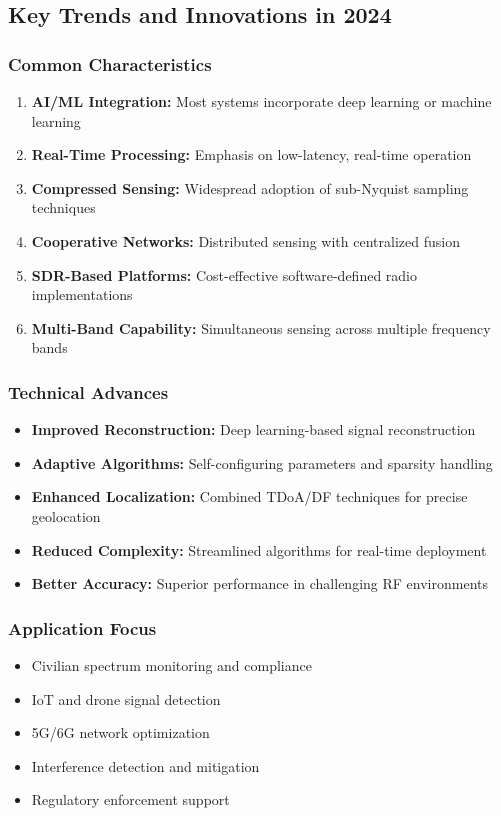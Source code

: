 \documentclass[14pt]{book}
\begin{document}
\subsection{Key Trends and Innovations in 2024}

\subsubsection{Common Characteristics}
\begin{enumerate}
	\item \textbf{AI/ML Integration:} Most systems incorporate deep learning or machine learning
	\item \textbf{Real-Time Processing:} Emphasis on low-latency, real-time operation
	\item \textbf{Compressed Sensing:} Widespread adoption of sub-Nyquist sampling techniques
	\item \textbf{Cooperative Networks:} Distributed sensing with centralized fusion
	\item \textbf{SDR-Based Platforms:} Cost-effective software-defined radio implementations
	\item \textbf{Multi-Band Capability:} Simultaneous sensing across multiple frequency bands
\end{enumerate}

\subsubsection{Technical Advances}
\begin{itemize}
	\item \textbf{Improved Reconstruction:} Deep learning-based signal reconstruction
	\item \textbf{Adaptive Algorithms:} Self-configuring parameters and sparsity handling
	\item \textbf{Enhanced Localization:} Combined TDoA/DF techniques for precise geolocation
	\item \textbf{Reduced Complexity:} Streamlined algorithms for real-time deployment
	\item \textbf{Better Accuracy:} Superior performance in challenging RF environments
\end{itemize}

\subsubsection{Application Focus}
\begin{itemize}
	\item Civilian spectrum monitoring and compliance
	\item IoT and drone signal detection
	\item 5G/6G network optimization
	\item Interference detection and mitigation
	\item Regulatory enforcement support
\end{itemize}
\end{document}

